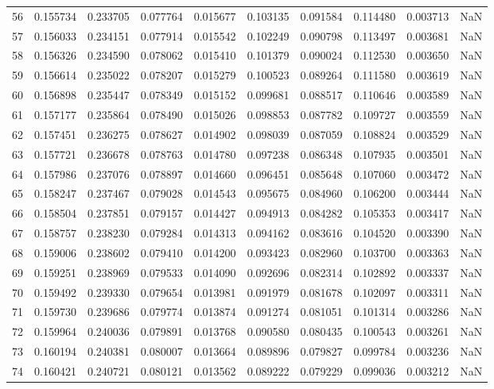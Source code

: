 \begin{tabular}{lrrrrrrrrr}
56 & 0.155734 & 0.233705 & 0.077764 & 0.015677 & 0.103135 & 0.091584 & 0.114480 & 0.003713 & NaN \\
57 & 0.156033 & 0.234151 & 0.077914 & 0.015542 & 0.102249 & 0.090798 & 0.113497 & 0.003681 & NaN \\
58 & 0.156326 & 0.234590 & 0.078062 & 0.015410 & 0.101379 & 0.090024 & 0.112530 & 0.003650 & NaN \\
59 & 0.156614 & 0.235022 & 0.078207 & 0.015279 & 0.100523 & 0.089264 & 0.111580 & 0.003619 & NaN \\
60 & 0.156898 & 0.235447 & 0.078349 & 0.015152 & 0.099681 & 0.088517 & 0.110646 & 0.003589 & NaN \\
61 & 0.157177 & 0.235864 & 0.078490 & 0.015026 & 0.098853 & 0.087782 & 0.109727 & 0.003559 & NaN \\
62 & 0.157451 & 0.236275 & 0.078627 & 0.014902 & 0.098039 & 0.087059 & 0.108824 & 0.003529 & NaN \\
63 & 0.157721 & 0.236678 & 0.078763 & 0.014780 & 0.097238 & 0.086348 & 0.107935 & 0.003501 & NaN \\
64 & 0.157986 & 0.237076 & 0.078897 & 0.014660 & 0.096451 & 0.085648 & 0.107060 & 0.003472 & NaN \\
65 & 0.158247 & 0.237467 & 0.079028 & 0.014543 & 0.095675 & 0.084960 & 0.106200 & 0.003444 & NaN \\
66 & 0.158504 & 0.237851 & 0.079157 & 0.014427 & 0.094913 & 0.084282 & 0.105353 & 0.003417 & NaN \\
67 & 0.158757 & 0.238230 & 0.079284 & 0.014313 & 0.094162 & 0.083616 & 0.104520 & 0.003390 & NaN \\
68 & 0.159006 & 0.238602 & 0.079410 & 0.014200 & 0.093423 & 0.082960 & 0.103700 & 0.003363 & NaN \\
69 & 0.159251 & 0.238969 & 0.079533 & 0.014090 & 0.092696 & 0.082314 & 0.102892 & 0.003337 & NaN \\
70 & 0.159492 & 0.239330 & 0.079654 & 0.013981 & 0.091979 & 0.081678 & 0.102097 & 0.003311 & NaN \\
71 & 0.159730 & 0.239686 & 0.079774 & 0.013874 & 0.091274 & 0.081051 & 0.101314 & 0.003286 & NaN \\
72 & 0.159964 & 0.240036 & 0.079891 & 0.013768 & 0.090580 & 0.080435 & 0.100543 & 0.003261 & NaN \\
73 & 0.160194 & 0.240381 & 0.080007 & 0.013664 & 0.089896 & 0.079827 & 0.099784 & 0.003236 & NaN \\
74 & 0.160421 & 0.240721 & 0.080121 & 0.013562 & 0.089222 & 0.079229 & 0.099036 & 0.003212 & NaN \\

\end{tabular}
